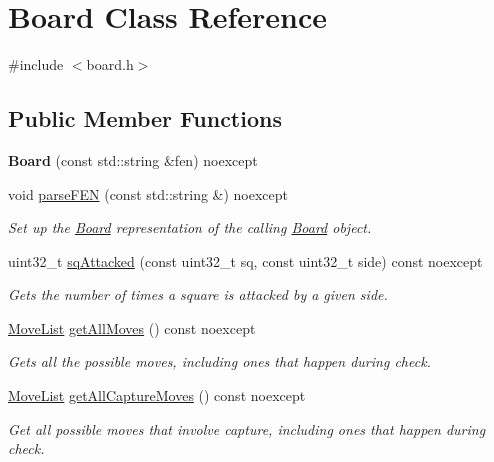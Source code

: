 \hypertarget{classBoard}{}\section{Board Class Reference}
\label{classBoard}


{\ttfamily \#include $<$board.\+h$>$}

\subsection*{Public Member Functions}
\begin{DoxyCompactItemize}
\item 
\mbox{\label{classBoard_a389b1348b474b089182d7205a71f4284}} 
{\bfseries Board} (const std\+::string \&fen) noexcept
\item 
void \mbox{\hyperlink{classBoard_a7cab67d5057bca8aeeb54a3cb84a1580}{parse\+F\+EN}} (const std\+::string \&) noexcept
\begin{DoxyCompactList}\small\item\em Set up the \mbox{\hyperlink{classBoard}{Board}} representation of the calling \mbox{\hyperlink{classBoard}{Board}} object. \end{DoxyCompactList}\item 
uint32\+\_\+t \mbox{\hyperlink{classBoard_aeb6553a6d78975ad65261542ba8989e4}{sq\+Attacked}} (const uint32\+\_\+t sq, const uint32\+\_\+t side) const noexcept
\begin{DoxyCompactList}\small\item\em Gets the number of times a square is attacked by a given side. \end{DoxyCompactList}\item 
\mbox{\hyperlink{classMoveList}{Move\+List}} \mbox{\hyperlink{classBoard_a515095fc28f6aa8057296914156b09cb}{get\+All\+Moves}} () const noexcept
\begin{DoxyCompactList}\small\item\em Gets all the possible moves, including ones that happen during check. \end{DoxyCompactList}\item 
\mbox{\hyperlink{classMoveList}{Move\+List}} \mbox{\hyperlink{classBoard_a884b9114fd749aeec4359fac01eb1db1}{get\+All\+Capture\+Moves}} () const noexcept
\begin{DoxyCompactList}\small\item\em Get all possible moves that involve capture, including ones that happen during check. \end{DoxyCompactList}\item 

\end{DoxyCompactItemize}
